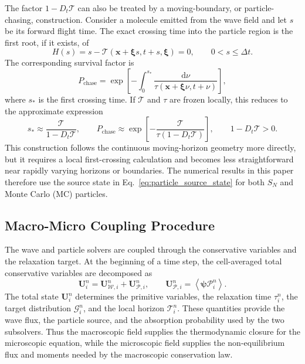 \documentclass[preprint,12pt]{elsarticle}
\begin{document}
The factor $1-D_t \mathcal{T}$ can also be treated by a moving-boundary, or particle-chasing, construction. Consider a molecule emitted from the wave field and let $s$ be its forward flight time. The exact crossing time into the particle region is the first root, if it exists, of
\begin{equation}\label{eq:chasing_root}
    H(s)=s-\mathcal{T}(\boldsymbol{x}+\boldsymbol{\xi} s,t+s,\boldsymbol{\xi})=0,
    \qquad 0<s\le\Delta t .
\end{equation}
The corresponding survival factor is
\begin{equation}\label{eq:chasing_survival}
    P_{\mathrm{chase}}
    =
    \exp\!\left[
    -\int_0^{s_*}
    \frac{\mathrm{d}\nu}{\tau(\boldsymbol{x}+\boldsymbol{\xi}\nu,t+\nu)}
    \right],
\end{equation}
where $s_*$ is the first crossing time. If $\mathcal{T}$ and $\tau$ are frozen locally, this reduces to the approximate expression
\begin{equation}\label{eq:frozen_chasing_probability}
    s_*\approx\frac{\mathcal{T}}{1-D_t \mathcal{T}},
    \qquad
    P_{\mathrm{chase}}
    \approx
    \exp\!\left[-\frac{\mathcal{T}}{\tau(1-D_t \mathcal{T})}\right],
    \qquad 1-D_t \mathcal{T}>0 .
\end{equation}
This construction follows the continuous moving-horizon geometry more directly, but it requires a local first-crossing calculation and becomes less straightforward near rapidly varying horizons or boundaries. The numerical results in this paper therefore use the source state in Eq.~\eqref{eq:particle_source_state} for both $S_N$ and Monte Carlo (MC) particles.

\subsection{Macro-Micro Coupling Procedure}\label{sec:algorithm_coupling}

The wave and particle solvers are coupled through the conservative variables and the relaxation target. At the beginning of a time step, the cell-averaged total conservative variables are decomposed as
\begin{equation}\label{eq:algorithm_macro_micro_split}
    \mathbf U_i^n=\mathbf U_{\mathcal{W},i}^n+\mathbf U_{\mathcal{P},i}^n,
    \qquad
    \mathbf U_{\mathcal{P},i}^n=\left\langle \boldsymbol{\psi}\mathcal{P}_i^n \right\rangle.
\end{equation}
The total state $\mathbf U_i^n$ determines the primitive variables, the relaxation time $\tau_i^n$, the target distribution $\mathcal{G}_i^n$, and the local horizon $\mathcal{T}_i^n$. These quantities provide the wave flux, the particle source, and the absorption probability used by the two subsolvers. Thus the macroscopic field supplies the thermodynamic closure for the microscopic equation, while the microscopic field supplies the non-equilibrium flux and moments needed by the macroscopic conservation law.
\end{document}
